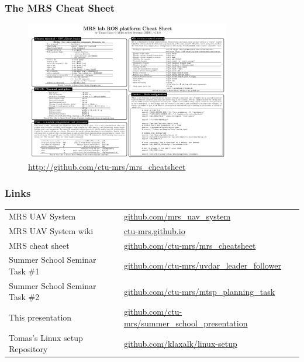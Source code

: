 \documentclass[aspectratio=1610]{beamer}
\begin{document}


  \begin{frame}
    \frametitle{The MRS Cheat Sheet}
    \vspace{-1.0em}
    \begin{figure}
      \caption*{\url{http://github.com/ctu-mrs/mrs_cheatsheet}}
      \vspace{-0.5em}
      \includegraphics[width=0.8\textwidth]{fig/mrs_cheatsheet.png}
    \end{figure}

  \end{frame}


  \begin{frame}
    \frametitle{Links}

    \begin{tabular}{ll}

      MRS UAV System & {\small \url{github.com/mrs_uav_system}}\\
      MRS UAV System wiki                       & {\small \url{ctu-mrs.github.io}}\\
      MRS cheat sheet                & {\small \url{github.com/ctu-mrs/mrs_cheatsheet}}\\
      Summer School Seminar Task \#1 & {\small \url{github.com/ctu-mrs/uvdar_leader_follower}}\\
      Summer School Seminar Task \#2 & {\small \url{github.com/ctu-mrs/mtsp_planning_task}}\\
      This presentation              & {\small \url{github.com/ctu-mrs/summer_school_presentation}}\\
      Tomas's Linux setup Repository & {\small \url{github.com/klaxalk/linux-setup}}\\
    \end{tabular}

  \end{frame}
\end{document}
